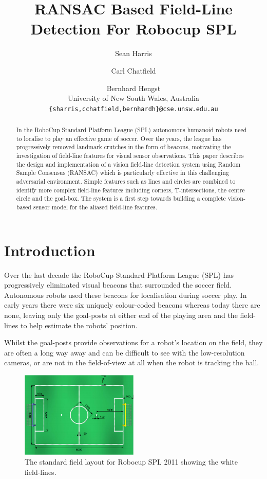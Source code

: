 \documentclass{article}
\title{RANSAC Based Field-Line Detection For Robocup SPL}
\author{Sean Harris \and Carl Chatfield \and Bernhard Hengst\\ University of New South Wales, Australia\\ 
\texttt{\{sharris,cchatfield,bernhardh\}@cse.unsw.edu.au}
}
\begin{document}
\maketitle

\begin{abstract}
In the RoboCup Standard Platform League (SPL) autonomous humanoid robots need to localise to play an effective game of soccer. Over the years, the league has progressively removed landmark crutches in the form of beacons, motivating the investigation of field-line features for visual sensor observations. This paper describes the design and implementation of a vision field-line detection system using Random Sample Consensus (RANSAC) which is particularly effective in this challenging adversarial environment. Simple features such as lines and circles are combined to identify more complex field-line features including corners, T-intersections, the centre circle and the goal-box. The system is a first step towards building a complete vision-based sensor model for the aliased field-line features.  
\end{abstract}

\section{Introduction}

Over the last decade the RoboCup Standard Platform League (SPL) has progressively eliminated visual beacons that surrounded the soccer field. Autonomous robots used these beacons for localisation during soccer play. In early years there were six uniquely colour-coded beacons whereas today there are none, leaving only the goal-posts at either end of the playing area and the field-lines to help estimate the robots' position. 

Whilst the goal-posts provide observations for a robot's location on the field, they are often a long way away and can be difficult to see with the low-resolution cameras, or are not in the field-of-view at all when the robot is tracking the ball. 

\begin{figure}[H]
\centering
\includegraphics[width=0.5\textwidth]{Pictures/field.png}
\caption{The standard field layout for Robocup SPL 2011 showing the white field-lines.}\label{fig:field}
\end{figure}
\end{document}
